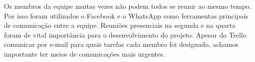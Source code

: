 Os membros da equipe muitas vezes não podem todos se reunir ao mesmo tempo. Por isso foram utilizados o Facebook e o WhatsApp como ferramentas principais de comunicação entre a equipe. Reuniões presenciais na segunda e na quarta foram de vital importância para o desenvolvimento do projeto. Apesar do Trello comunicar por e-mail para quais tarefas cada membro foi designado, achamos importante ter meios de comunicações mais urgentes.
